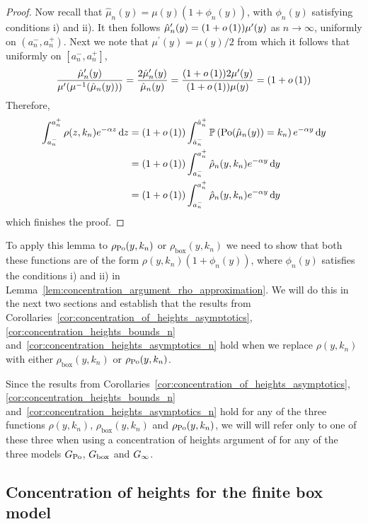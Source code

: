 \begin{proof}
Now recall that $\hat{\mu}_n(y) = \mu(y)(1 + \phi_n(y))$, with $\phi_n(y)$ satisfying conditions i) and ii). It then follows $\hat{\mu}_n^\prime(y) = (1 + o\left(1\right))\mu^\prime(y)$ as $n \to \infty$, uniformly on $(a_n^-, a_n^+)$. Next we note that $\mu^\prime(y) = \mu(y)/2$ from which it follows that uniformly on $[a_n^-, a_n^+]$,
\[
	\frac{\hat{\mu}_n^\prime(y)}{\mu^\prime(\mu^{-1}(\hat{\mu}_n(y)))}
	= \frac{2\hat{\mu}_n^\prime(y)}{\hat{\mu}_n(y)}
	= \frac{(1 + o\left(1\right))2\mu^\prime(y)}{(1 + o\left(1\right))\mu(y)}
	= (1+o\left(1\right))
\]
Therefore,
\begin{align*}
	\int_{a_n^-}^{a_n^+} \rho(z,k_n) e^{-\alpha z} \operatorname{\mathrm{d}\hspace{-2pt}} z
	&= (1 + o\left(1\right))\int_{\hat{a}_n^-}^{\hat{a}_n^+} \mathbb{P}\left({\mathrm{Po}}(\hat{\mu}_n(y)) = k_n\right) e^{-\alpha y} \operatorname{\mathrm{d}\hspace{-2pt}} y\\
	&= (1 + o\left(1\right)) \int_{a_n^-}^{a_n^+} \hat{\rho}_n(y,k_n) e^{-\alpha y} \operatorname{\mathrm{d}\hspace{-2pt}} y\\
	&= (1 + o\left(1\right)) \int_{a_n^-}^{a_n^+} \hat{\rho}_n(y,k_n) e^{-\alpha y} \operatorname{\mathrm{d}\hspace{-2pt}} y
\end{align*}
which finishes the proof.
\end{proof}

To apply this lemma to $\rho_{{\mathrm{Po}}}(y,k_n)$ or $\rho_{\text{box}}(y,k_n)$ we need to show that both these functions are of the form $\rho(y,k_n)(1 + \phi_n(y))$, where $\phi_n(y)$ satisfies the conditions i) and ii) in Lemma~\ref{lem:concentration_argument_rho_approximation}. We will do this in the next two sections and establish that the results from Corollaries~\ref{cor:concentration_of_heights_asymptotics}, \ref{cor:concentration_heights_bounds_n}
and~\ref{cor:concentration_heights_asymptotics_n} hold when we replace $\rho(y,k_n)$ with either $\rho_{\text{box}}(y,k_n)$
or $\rho_{{\mathrm{Po}}}(y,k_n)$. 

\begin{remark}
Since the results from Corollaries~\ref{cor:concentration_of_heights_asymptotics}, \ref{cor:concentration_heights_bounds_n} and~\ref{cor:concentration_heights_asymptotics_n} hold for any of the three functions $\rho(y,k_n)$, $\rho_{\text{box}}(y,k_n)$ and $\rho_{{\mathrm{Po}}}(y,k_n)$, we will will refer only to one of these three when using a concentration of heights argument of for any of the three models $G_{\text{Po}}$, $G_{\text{box}}$ and $G_{\infty}$. 
\end{remark}

\subsection{Concentration of heights for the finite box model}\label{ssec:average_degree_P_n}

